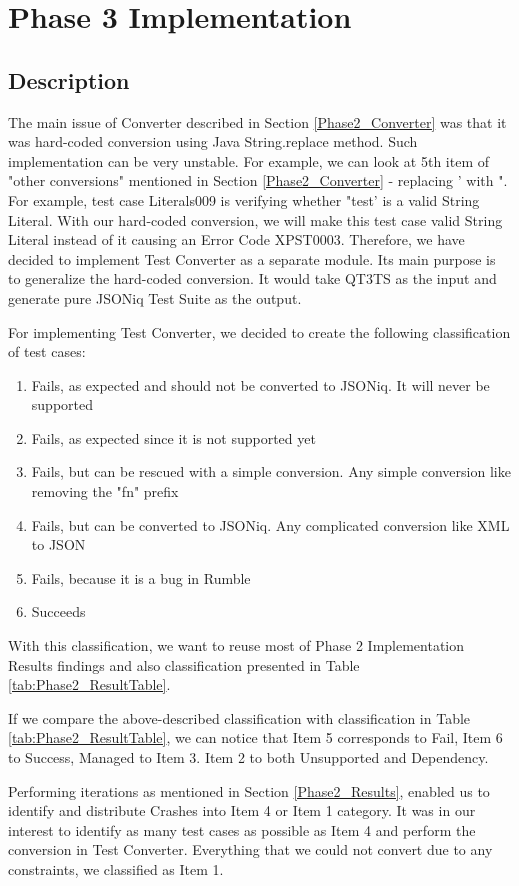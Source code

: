 \section{Phase 3 Implementation}
\subsection{Description}
\label{Phase3_Description}
The main issue of Converter described in Section \ref{Phase2_Converter} was that it was hard-coded conversion using Java String.replace method. Such implementation can be very unstable. For example, we can look at 5th item of "other conversions" mentioned in Section \ref{Phase2_Converter} - replacing ' with ". For example, test case Literals009 is verifying whether "test' is a valid String Literal. With our hard-coded conversion, we will make this test case valid String Literal instead of it causing an Error Code XPST0003. Therefore, we have decided to implement Test Converter as a separate module. Its main purpose is to generalize the hard-coded conversion. It would take QT3TS as the input and generate pure JSONiq Test Suite as the output.

For implementing Test Converter, we decided to create the following classification of test cases:
\begin{enumerate}
	\item Fails, as expected and should not be converted to JSONiq. It will never be supported
	\item Fails, as expected since it is not supported yet
	\item Fails, but can be rescued with a simple conversion. Any simple conversion like removing the "fn" prefix 
	\item Fails, but can be converted to JSONiq. Any complicated conversion like XML to JSON
	\item Fails, because it is a bug in Rumble
	\item Succeeds
\end{enumerate}

With this classification, we want to reuse most of Phase 2 Implementation Results findings and also classification presented in Table \ref{tab:Phase2_ResultTable}.

If we compare the above-described classification with classification in Table \ref{tab:Phase2_ResultTable}, we can notice that Item 5 corresponds to Fail, Item 6 to Success, Managed to Item 3. Item 2 to both Unsupported and Dependency. 

Performing iterations as mentioned in Section \ref{Phase2_Results}, enabled us to identify and distribute Crashes into Item 4 or Item 1 category. It was in our interest to identify as many test cases as possible as Item 4 and perform the conversion in Test Converter. Everything that we could not convert due to any constraints, we classified as Item 1. 

